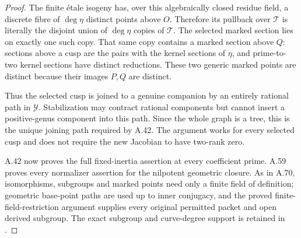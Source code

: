 \begin{proof}
The finite \'{e}tale isogeny has, over this algebraically closed
residue field, a discrete fibre of \(\deg\eta\) distinct
points above \(O\). Therefore its pullback over \(\mathcal T\)
is literally the disjoint union of \(\deg\eta\) copies of
\(\mathcal T\). The selected marked section lies on exactly
one such copy. That same copy contains a marked section above
\(Q\): sections above a cusp are the pairs with the kernel
sections of \(\eta\), and prime-to-two kernel sections have
distinct reductions. These two generic marked points are
distinct because their images \(P,Q\) are distinct.

Thus the selected cusp is joined to a genuine companion by an
entirely rational path in \(\mathcal Y\). Stabilization may
contract rational components but cannot insert a positive-genus
component into this path. Since the whole graph is a tree, this
is the unique joining path required by A.42. The argument works
for every selected cusp and does not require the new Jacobian
to have two-rank zero.

A.42 now proves the full fixed-inertia assertion at every
coefficient prime. A.59 proves every normalizer assertion for
the nilpotent geometric closure. As in A.70, isomorphisms,
subgroups and marked points need only a finite field of
definition; geometric base-point paths are used up to inner
conjugacy, and the proved finite-field-restriction argument
supplies every original permitted packet and open derived
subgroup. The exact subgroup and curve-degree support is retained in
.
\end{proof}
